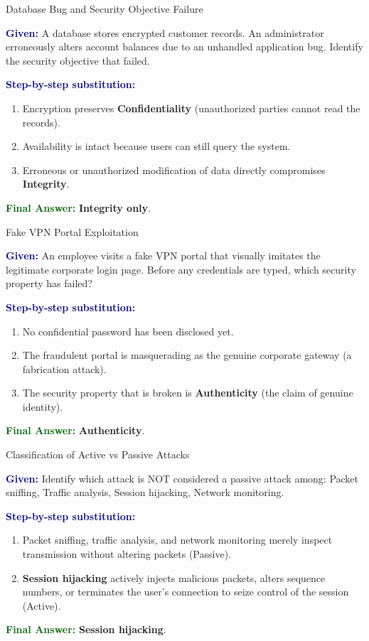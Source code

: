 \documentclass[11pt,a4paper,openany]{report}
\newcommand{\Given}{\par\textbf{\textcolor{navy}{Given:}} }
\newcommand{\Steps}{\par\textbf{\textcolor{navy}{Step-by-step substitution:}}\par}
\newcommand{\Answer}{\par\textbf{\textcolor{darkgreen}{Final Answer:}} }
\begin{document}
\begin{solved}{Database Bug and Security Objective Failure}
\Given A database stores encrypted customer records. An administrator erroneously alters account balances due to an unhandled application bug. Identify the security objective that failed.
\Steps
\begin{enumerate}[leftmargin=*]
  \item Encryption preserves \textbf{Confidentiality} (unauthorized parties cannot read the records).
  \item Availability is intact because users can still query the system.
  \item Erroneous or unauthorized modification of data directly compromises \textbf{Integrity}.
\end{enumerate}
\Answer \textbf{Integrity only}.
\end{solved}

\begin{solved}{Fake VPN Portal Exploitation}
\Given An employee visits a fake VPN portal that visually imitates the legitimate corporate login page. Before any credentials are typed, which security property has failed?
\Steps
\begin{enumerate}[leftmargin=*]
  \item No confidential password has been disclosed yet.
  \item The fraudulent portal is masquerading as the genuine corporate gateway (a fabrication attack).
  \item The security property that is broken is \textbf{Authenticity} (the claim of genuine identity).
\end{enumerate}
\Answer \textbf{Authenticity}.
\end{solved}

\begin{solved}{Classification of Active vs Passive Attacks}
\Given Identify which attack is NOT considered a passive attack among: Packet sniffing, Traffic analysis, Session hijacking, Network monitoring.
\Steps
\begin{enumerate}[leftmargin=*]
  \item Packet sniffing, traffic analysis, and network monitoring merely inspect transmission without altering packets (Passive).
  \item \textbf{Session hijacking} actively injects malicious packets, alters sequence numbers, or terminates the user's connection to seize control of the session (Active).
\end{enumerate}
\Answer \textbf{Session hijacking}.
\end{solved}
\end{document}
